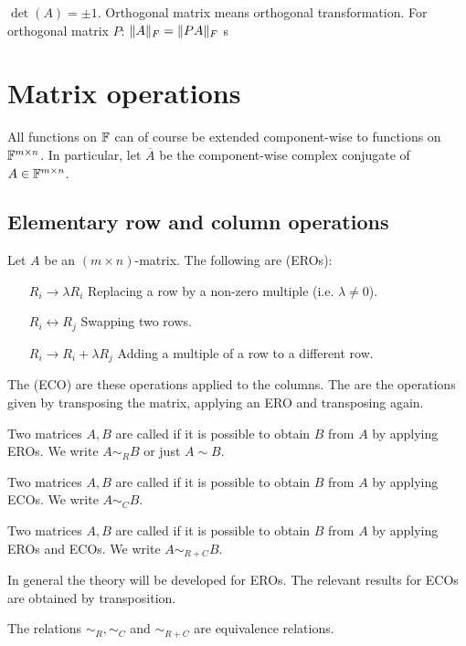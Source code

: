 $\det(A) = \pm 1$. Orthogonal matrix means orthogonal transformation.
For orthogonal matrix $P$: $\lVert A\rVert_F = \lVert PA\rVert_F$
s




\section{Matrix operations}
All functions on $\mathbb{F}$ can of course be extended component-wise to functions on $\mathbb{F}^{m\times n}$. In particular, let $\overline{A}$ be the component-wise complex conjugate of $A\in\mathbb{F}^{m\times n}$.
\subsection{Elementary row and column operations}
\begin{definition}
Let $A$ be an $(m\times n)$-matrix. The following are  (EROs):
\begin{itemize}[leftmargin=3cm]
\item[$\boxed{R_i \to \lambda R_i}$] Replacing a row by a non-zero multiple (i.e. $\lambda \neq 0$).
\item[$\boxed{R_i \leftrightarrow R_j}$] Swapping two rows.
\item[$\boxed{R_i \to R_i+ \lambda R_j}$] Adding a multiple of a row to a different row.
\end{itemize}
The  (ECO) are these operations applied to the columns. The are the operations given by transposing the matrix, applying an ERO and transposing again.

Two matrices $A,B$ are called  if it is possible to obtain $B$ from $A$ by applying EROs. We write $A\sim_R B$ or just $A\sim B$.

Two matrices $A,B$ are called  if it is possible to obtain $B$ from $A$ by applying ECOs. We write $A\sim_C B$.

Two matrices $A,B$ are called  if it is possible to obtain $B$ from $A$ by applying EROs and ECOs. We write $A\sim_{R+C} B$.
\end{definition}
In general the theory will be developed for EROs. The relevant results for ECOs are obtained by transposition.

\begin{lemma}
The relations $\sim_R, \sim_C$ and $\sim_{R+C}$ are equivalence relations.
\end{lemma}

